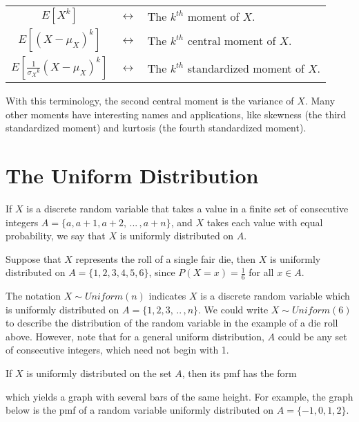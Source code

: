 \begin{center}
\begin{tabular}{ccl}
\vspace*{0.1in}
$E[X^k]$ & $\longleftrightarrow$ & The $k^{th}$ moment of $X$. \\
\vspace*{0.075in}
$E[(X-\mu_X)^k]$ & $\longleftrightarrow$ & The $k^{th}$ central moment of $X$. \\
$E\left[\frac{1}{{\sigma_X}^k}(X - \mu_X)^k\right]$ & $\longleftrightarrow$ & The $k^{th}$ standardized moment of $X$.  \\
\end{tabular}
\end{center}

With this terminology, the second central moment is the variance of $X$. Many other moments have interesting names and applications, like skewness (the third standardized moment) and kurtosis (the fourth standardized moment).

\section{The Uniform Distribution}

\begin{defn} If $X$ is a discrete random variable that takes a value in a finite set of consecutive integers $A = \{a, a+1, a+2, \, ... \, , a+n\}$, and $X$ takes each value with equal probability, we say that $X$ is uniformly distributed on $A$. \end{defn}

\begin{examp} Suppose that $X$ represents the roll of a single fair die, then $X$ is uniformly distributed on $A = \{1,2,3,4,5,6\}$, since $P(X = x) = \frac{1}{6}$ for all $x \in A$.
\end{examp}

The notation $X \sim Uniform(n)$ indicates $X$ is a discrete random variable which is uniformly distributed on $A = \{1,2,3, \, .. \,, n\}$. We could write $X \sim Uniform(6)$ to describe the distribution of the random variable in the example of a die roll above. However, note that for a general uniform distribution, $A$ could be any set of consecutive integers, which need not begin with 1.
\par
If $X$ is uniformly distributed on the set $A$, then its pmf has the form
\renewcommand*{\arraystretch}{1.35}
\renewcommand*{\arraystretch}{1}
\par
\noindent which yields a graph with several bars of the same height. For example, the graph below is the pmf of a random variable uniformly distributed on $A = \{-1,0,1,2\}$.

